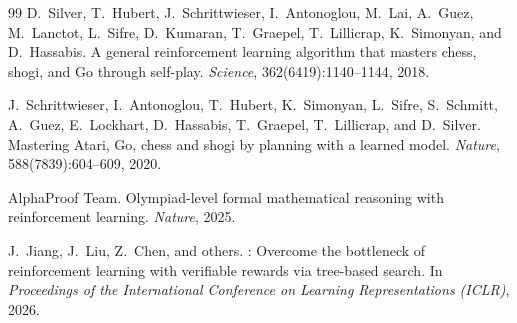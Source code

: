 \documentclass[11pt]{article}
\begin{document}
\begin{thebibliography}{99}
D.~Silver, T.~Hubert, J.~Schrittwieser, I.~Antonoglou, M.~Lai, A.~Guez, M.~Lanctot, L.~Sifre, D.~Kumaran, T.~Graepel, T.~Lillicrap, K.~Simonyan, and D.~Hassabis.
\newblock A general reinforcement learning algorithm that masters chess, shogi, and {G}o through self-play.
\newblock \emph{Science}, 362(6419):1140--1144, 2018.

J.~Schrittwieser, I.~Antonoglou, T.~Hubert, K.~Simonyan, L.~Sifre, S.~Schmitt, A.~Guez, E.~Lockhart, D.~Hassabis, T.~Graepel, T.~Lillicrap, and D.~Silver.
\newblock Mastering {A}tari, {G}o, chess and shogi by planning with a learned model.
\newblock \emph{Nature}, 588(7839):604--609, 2020.

AlphaProof Team.
\newblock Olympiad-level formal mathematical reasoning with reinforcement learning.
\newblock \emph{Nature}, 2025.

J.~Jiang, J.~Liu, Z.~Chen, and others.
: Overcome the bottleneck of reinforcement learning with verifiable rewards via tree-based search.
\newblock In \emph{Proceedings of the International Conference on Learning Representations (ICLR)}, 2026.

\end{thebibliography}
\end{document}
